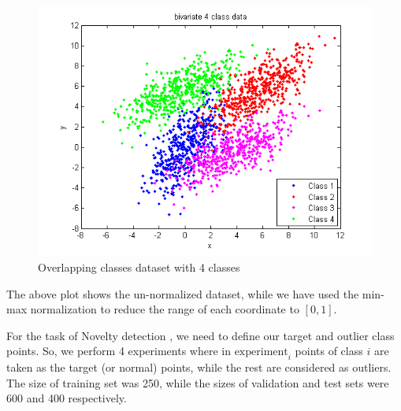 \documentclass{article} %
\begin{document}
\begin{figure}
  \centering
  \includegraphics[width=\linewidth]{Plots/overlapping/svdd/data}
  \caption{Overlapping classes dataset with 4 classes}
\end{figure}

The above plot shows the un-normalized dataset, while we have used the min-max normalization to reduce the  range of each coordinate to $[0,1]$. 

For the task of Novelty detection , we need to define our target and outlier class points. So, we perform 4 experiments where in $\text{experiment}_{i}$ points of class $i$ are taken as the target (or normal) points, while the rest are considered as outliers. The size of training set was 250, while the sizes of validation and test sets were 600 and 400 respectively.
\end{document}
